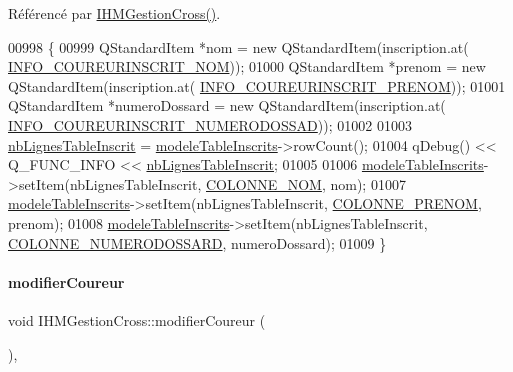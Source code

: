 Référencé par \hyperlink{class_i_h_m_gestion_cross_a2c62fd83326a87456a403f46acc408c8}{I\+H\+M\+Gestion\+Cross()}.


\begin{DoxyCode}
00998 \{
00999     QStandardItem *nom = \textcolor{keyword}{new} QStandardItem(inscription.at(
      \hyperlink{ihmgestioncross_8h_aa5b4e42123269ad7f574258d5bbb9cda}{INFO\_COUREURINSCRIT\_NOM}));
01000     QStandardItem *prenom = \textcolor{keyword}{new} QStandardItem(inscription.at(
      \hyperlink{ihmgestioncross_8h_a73a7d4efe208177f86cc761b0d5fd089}{INFO\_COUREURINSCRIT\_PRENOM}));
01001     QStandardItem *numeroDossard = \textcolor{keyword}{new} QStandardItem(inscription.at(
      \hyperlink{ihmgestioncross_8h_a460662db33a6d68eead7d488ee61a76c}{INFO\_COUREURINSCRIT\_NUMERODOSSAD}));
01002 
01003     \hyperlink{class_i_h_m_gestion_cross_ad33a263cb137ae991a9be57dacc6760a}{nbLignesTableInscrit} = \hyperlink{class_i_h_m_gestion_cross_a19565551280115e642ceb9790c7317bc}{modeleTableInscrits}->rowCount();
01004     qDebug() << Q\_FUNC\_INFO << \hyperlink{class_i_h_m_gestion_cross_ad33a263cb137ae991a9be57dacc6760a}{nbLignesTableInscrit};
01005 
01006     \hyperlink{class_i_h_m_gestion_cross_a19565551280115e642ceb9790c7317bc}{modeleTableInscrits}->setItem(nbLignesTableInscrit, 
      \hyperlink{ihmchronocross_8h_aeee76385895c145ef5a633e6c6812603}{COLONNE\_NOM}, nom);
01007     \hyperlink{class_i_h_m_gestion_cross_a19565551280115e642ceb9790c7317bc}{modeleTableInscrits}->setItem(nbLignesTableInscrit, 
      \hyperlink{ihmchronocross_8h_a5d6f240d26209cd66db8aa5e1aac62f9}{COLONNE\_PRENOM}, prenom);
01008     \hyperlink{class_i_h_m_gestion_cross_a19565551280115e642ceb9790c7317bc}{modeleTableInscrits}->setItem(nbLignesTableInscrit, 
      \hyperlink{ihmgestioncross_8h_a20d627e7b24ae715fda576e69408ae3f}{COLONNE\_NUMERODOSSARD}, numeroDossard);
01009 \}
\end{DoxyCode}
\mbox{\label{class_i_h_m_gestion_cross_a1f41cea488ab477505f9d1792c4c2f36}} 
\paragraph{\texorpdfstring{modifier\+Coureur}{modifierCoureur}}
{\footnotesize\ttfamily void I\+H\+M\+Gestion\+Cross\+::modifier\+Coureur (\begin{DoxyParamCaption}{ }\end{DoxyParamCaption})\hspace{0.3cm}{\ttfamily [private]}, {\ttfamily [slot]}}



